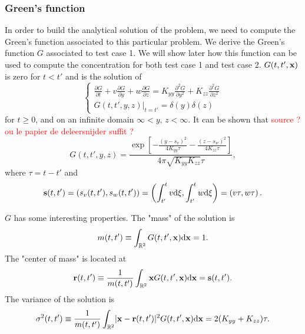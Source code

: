 \subsubsection{Green's function}
In order to build the analytical solution of the problem, we need to compute the Green's function associated to this particular problem. We derive the Green's function $G$ associated to test case 1. We will show later how this function can be used to compute the concentration for both test case 1 and test case 2. $\G$ is zero for $t<t'$ and is the solution of
\begin{equation} \label{eq:testcase_green}
	\begin{cases}
		\frac{\partial G}{\partial t} + v \frac{\partial G}{\partial y} + w\frac{\partial G}{\partial z} = K_{yy}\frac{\partial^2 G}{\partial y^2} + K_{zz}\frac{\partial^2 G}{\partial z^2}\\[.1cm]
		\left. G(t,t',y,z) \right \rvert_{t=t'} = \delta(y)\delta(z) 
	\end{cases}
\end{equation}
for $t \ge 0$, and on an infinite domain $\infty < y,\, z < \infty$. It can be shown that \textcolor{red}{source ? ou le papier de deleersnijder suffit ?}
\begin{equation} 
	G(t,t',y,z) = \frac{\exp\left[-\frac{(y-s_v)^2}{4K_{yy}\tau} -\frac{(z-s_w)^2}{4K_{zz}\tau} \right]}{4\pi\sqrt{K_{yy}K_{zz}}\tau},
\end{equation}
where $\tau = t-t'$ and 
\begin{equation}
	\b s(t,t') = (s_v(t,t'), s_w(t,t')) = \left(\int_{t'}^{t}v \rm d \xi, \int_{t'}^{t}w \rm d \xi \right) = \left(v\tau, w\tau\right).
\end{equation}

$G$ has some interesting properties. The "mass" of the solution is
\begin{equation} \label{eq:testcase:propmass}
	m(t,t') \equiv \int_{\R[2]} \G \rm d \b x = 1.
\end{equation}
The "center of mass" is located at
\begin{equation} \label{eq:testcase:propcenter}
	\b r(t,t') \equiv \frac{1}{m(t,t')} \int_{\R[2]} \b x \G \rm d \b x  = \b s(t,t').
\end{equation}
The variance of the solution is
\begin{equation} \label{eq:testcase:propvar}
	\sigma^2(t,t') \equiv \frac{1}{m(t,t')} \int_{\R[2]} \lvert \b x - \b r(t,t') \rvert^2 \G \rm d \b x = 2 (K_{yy}+K_{zz}) \tau.
\end{equation}

